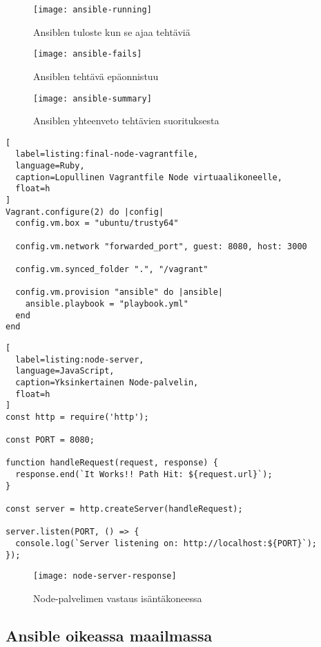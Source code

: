 \begin{figure}[h]
  \texttt{[image: ansible-running]}
  \caption{Ansiblen tuloste kun se ajaa tehtäviä}
  \label{fig:ansible-running}
\end{figure}

\begin{figure}[h]
  \texttt{[image: ansible-fails]}
  \caption{Ansiblen tehtävä epäonnistuu}
  \label{fig:ansible-fails}
\end{figure}

\begin{figure}[h]
  \texttt{[image: ansible-summary]}
  \caption{Ansiblen yhteenveto tehtävien suorituksesta}
  \label{fig:ansible-summary}
\end{figure}

\begin{lstlisting}[
  label=listing:final-node-vagrantfile,
  language=Ruby,
  caption=Lopullinen Vagrantfile Node virtuaalikoneelle,
  float=h
]
Vagrant.configure(2) do |config|
  config.vm.box = "ubuntu/trusty64"

  config.vm.network "forwarded_port", guest: 8080, host: 3000

  config.vm.synced_folder ".", "/vagrant"

  config.vm.provision "ansible" do |ansible|
    ansible.playbook = "playbook.yml"
  end
end
\end{lstlisting}

\begin{lstlisting}[
  label=listing:node-server,
  language=JavaScript,
  caption=Yksinkertainen Node-palvelin,
  float=h
]
const http = require('http');

const PORT = 8080;

function handleRequest(request, response) {
  response.end(`It Works!! Path Hit: ${request.url}`);
}

const server = http.createServer(handleRequest);

server.listen(PORT, () => {
  console.log(`Server listening on: http://localhost:${PORT}`);
});
\end{lstlisting}

\begin{figure}[h]
  \texttt{[image: node-server-response]}
  \caption{Node-palvelimen vastaus isäntäkoneessa}
  \label{fig:node-server-response}
\end{figure}

\subsection{Ansible oikeassa maailmassa}

